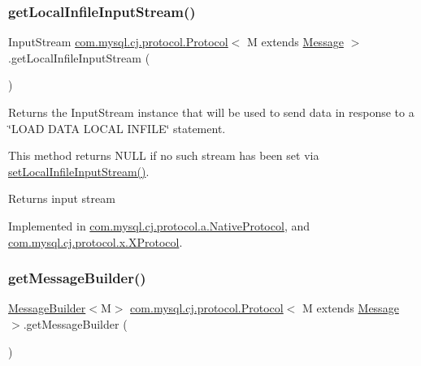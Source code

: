 \subsubsection{\texorpdfstring{get\+Local\+Infile\+Input\+Stream()}{getLocalInfileInputStream()}}
{\footnotesize\ttfamily Input\+Stream \mbox{\hyperlink{interfacecom_1_1mysql_1_1cj_1_1protocol_1_1_protocol}{com.\+mysql.\+cj.\+protocol.\+Protocol}}$<$ M extends \mbox{\hyperlink{interfacecom_1_1mysql_1_1cj_1_1protocol_1_1_message}{Message}} $>$.get\+Local\+Infile\+Input\+Stream (\begin{DoxyParamCaption}{ }\end{DoxyParamCaption})}

Returns the Input\+Stream instance that will be used to send data in response to a \char`\"{}\+L\+O\+A\+D D\+A\+T\+A L\+O\+C\+A\+L I\+N\+F\+I\+L\+E\char`\"{} statement.

This method returns N\+U\+LL if no such stream has been set via \mbox{\hyperlink{interfacecom_1_1mysql_1_1cj_1_1protocol_1_1_protocol_a995483a591a66d63e273140ef0ac47e7}{set\+Local\+Infile\+Input\+Stream()}}.

\begin{DoxyReturn}{Returns}
input stream 
\end{DoxyReturn}


Implemented in \mbox{\hyperlink{classcom_1_1mysql_1_1cj_1_1protocol_1_1a_1_1_native_protocol_a27e42d277d58cc8bc89f098b9ac90691}{com.\+mysql.\+cj.\+protocol.\+a.\+Native\+Protocol}}, and \mbox{\hyperlink{classcom_1_1mysql_1_1cj_1_1protocol_1_1x_1_1_x_protocol_a5a291c17d84fa71984b3a65ecbb91315}{com.\+mysql.\+cj.\+protocol.\+x.\+X\+Protocol}}.

\mbox{\label{interfacecom_1_1mysql_1_1cj_1_1protocol_1_1_protocol_a6a924ac14232063c3eab7b70a376ab29}} 
\subsubsection{\texorpdfstring{get\+Message\+Builder()}{getMessageBuilder()}}
{\footnotesize\ttfamily \mbox{\hyperlink{interfacecom_1_1mysql_1_1cj_1_1_message_builder}{Message\+Builder}}$<$M$>$ \mbox{\hyperlink{interfacecom_1_1mysql_1_1cj_1_1protocol_1_1_protocol}{com.\+mysql.\+cj.\+protocol.\+Protocol}}$<$ M extends \mbox{\hyperlink{interfacecom_1_1mysql_1_1cj_1_1protocol_1_1_message}{Message}} $>$.get\+Message\+Builder (\begin{DoxyParamCaption}{ }\end{DoxyParamCaption})}




